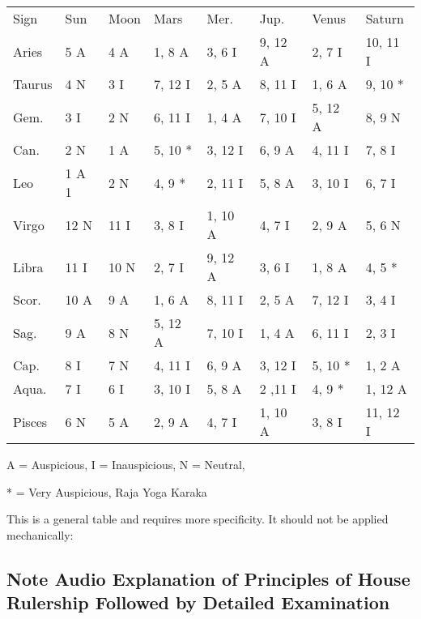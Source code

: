 \begin{center}
\begin{tabular}{ l l l l l l l l}
Sign &Sun	&Moon	&Mars	&Mer.	&Jup.	&Venus	&Saturn \\
Aries	& 5 A	&4 A	&1, 8 A	&3, 6 I	&9, 12 A	&2, 7 I	&10, 11 I\\
Taurus	&4 N	&3 I	&7, 12 I	&2, 5 A	&8, 11 I	&1, 6 A	&9, 10 *\\
Gem.	&3 I	&2 N&	6, 11 I	&1, 4 A	&7, 10 I	&5, 12 A	&8, 9 N\\
Can.	&2 N	&1 A	&5, 10 *	&3, 12 I	&6, 9 A	&4, 11 I	&7, 8 I\\
Leo	&1 A	1&2 N	&4, 9 *	&2, 11 I	&5, 8 A	&3, 10 I	&6, 7 I\\
Virgo	&12 N	&11 I	&3, 8 I	&1, 10 A	&4, 7 I	&2, 9 A	&5, 6 N\\
Libra	&11 I	&10 N	&2, 7 I	&9, 12 A	&3, 6 I	&1, 8 A	&4, 5 *\\
Scor.	&10 A	&9 A	&1, 6 A	&8, 11 I	&2, 5 A	&7, 12 I	&3, 4 I\\
Sag.	&9 A	&8 N	&5, 12 A	&7, 10 I	&1, 4 A	&6, 11 I	&2, 3 I\\
Cap.	&8 I	&7 N	&4, 11 I	&6, 9 A	&3, 12 I	&5, 10 *	&1, 2 A\\
Aqua.	&7 I	&6 I	&3, 10 I	&5, 8 A	&2 ,11 I	&4, 9 *	&1, 12 A\\
Pisces	&6 N	&5 A	&2, 9 A	&4, 7 I	&1, 10 A	&3, 8 I	&11, 12 I\\
 \end{tabular}
\end{center}
 

A = Auspicious, I = Inauspicious, N = Neutral,

* = Very Auspicious, Raja Yoga Karaka

 

This is a general table and requires more specificity. It should not be applied mechanically:



\subsection{\textbf{Note Audio Explanation of Principles of House Rulership Followed by Detailed Examination}}


